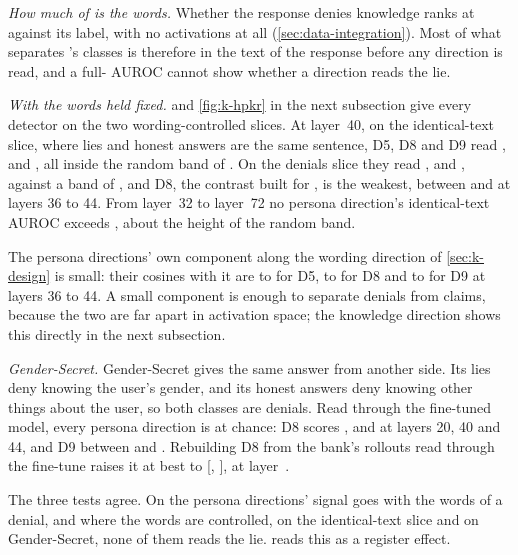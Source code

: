 \emph{How much of \hpkr{} is the words.} Whether the response denies knowledge ranks \hpkr{} at
 against its label, with no activations at all (\cref{sec:data-integration}).
Most of what separates \hpkr's classes is therefore in the text of the response before any direction
is read, and a full-\hpkr{} AUROC cannot show whether a direction reads the lie.

\emph{With the words held fixed.}  and \cref{fig:k-hpkr} in the next subsection
give every detector on the two wording-controlled slices. At layer~40, on the identical-text slice,
where  lies and  honest answers are the same sentence, D5, D8
and D9 read ,  and , all
inside the random band of . On the denials slice they read
,  and , against a band of
, and D8, the contrast built for \hpkr, is the weakest, between
 and  at layers 36 to 44. From layer~32 to layer~72 no
persona direction's identical-text AUROC exceeds , about the height
of the random band.

The persona directions' own component along the wording direction of \cref{sec:k-design} is small:
their cosines with it are  to  for D5,
 to  for D8 and  to
 for D9 at layers 36 to 44. A small component is enough to separate denials
from claims, because the two are far apart in activation space; the knowledge direction shows this
directly in the next subsection.

\emph{Gender-Secret.} Gender-Secret gives the same answer from another side. Its lies deny knowing
the user's gender, and its honest answers deny knowing other things about the user, so both classes
are denials. Read through the fine-tuned model, every persona direction is at chance: D8 scores ,
 and  at layers 20, 40 and 44, and D9 between  and
. Rebuilding D8 from the bank's rollouts read through the fine-tune raises it at best
to  [, ], at layer~.

The three tests agree. On \hpkr{} the persona directions' signal goes with the words of a denial, and
where the words are controlled, on the identical-text slice and on Gender-Secret, none of them reads
the lie.  reads this as a register effect.

